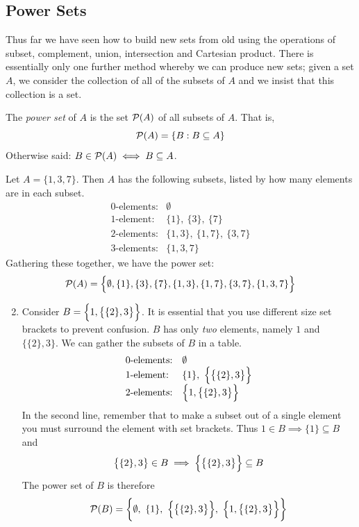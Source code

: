 \clearpage


\subsection{Power Sets}

Thus far we have seen how to build new sets from old using the operations of subset, complement, union, intersection and Cartesian product. There is essentially only one further method whereby we can produce new sets; given a set $A$, we consider the collection of all of the subsets of $A$ and we insist that this collection is a set.

\begin{defn}{}{}
	The \emph{power set} of $A$ is the set $\mathcal{P}(A)$ of all subsets of $A$. That is,
	\[
		\mathcal{P}(A)=\{B:B\subseteq A\}
	\]
	Otherwise said: $B\in\mathcal{P}(A)\iff B\subseteq A$.
\end{defn}

\begin{examples}{}{}
	\exstart Let $A=\{1,3,7\}$. Then $A$ has the following subsets, listed by how many elements are in each subset.
	\[
		\begin{array}{ll}
			\text{0-elements:}&\emptyset\\
			\text{1-element:}&\{1\},\ \{3\},\ \{7\}\\
			\text{2-elements:}&\{1,3\},\ \{1,7\},\ \{3,7\}\\
			\text{3-elements:}&\{1,3,7\}
		\end{array}
	\]
	Gathering these together, we have the power set:
	\[
		\mathcal{P}(A)=\Bigl\{\emptyset,\{1\},\{3\},\{7\},\{1,3\},\{1,7\},\{3,7\},\{1,3,7\}\Bigr\}
	\]
	\begin{enumerate}\setcounter{enumi}{1}
	  \item Consider $B=\Bigl\{1,\bigl\{\{2\},3\bigr\}\Bigr\}$. It is essential that you use different size set brackets to prevent confusion. $B$ has only \emph{two} elements, namely $1$ and $\bigl\{\{2\},3\bigr\}$. We can gather the subsets of $B$ in a table.
		\[
			\begin{array}{ll}
				\text{0-elements:}&\emptyset\\
				\text{1-element:}&\{1\},\ \Bigl\{\bigl\{\{2\},3\bigr\}\Bigr\}\\
				\text{2-elements:}&\Bigl\{1,\bigl\{\{2\},3\bigr\}\Bigr\}
			\end{array}
		\]
		In the second line, remember that to make a subset out of a single element you must surround the element with set brackets. Thus $1\in B\implies \{1\}\subseteq B$ and
		\[
			\bigl\{\{2\},3\bigr\}\in B\implies \Bigl\{\bigl\{\{2\},3\bigr\}\Bigr\}\subseteq B
		\]
		The power set of $B$ is therefore
		\[
			\cP(B)=\biggl\{\emptyset,\ \{1\},\ \Bigl\{\bigl\{\{2\},3\bigr\}\Bigr\},\ \Bigl\{1,\bigl\{\{2\},3\bigr\}\Bigr\}\biggr\}
		\]
	\end{enumerate}
\end{examples}


